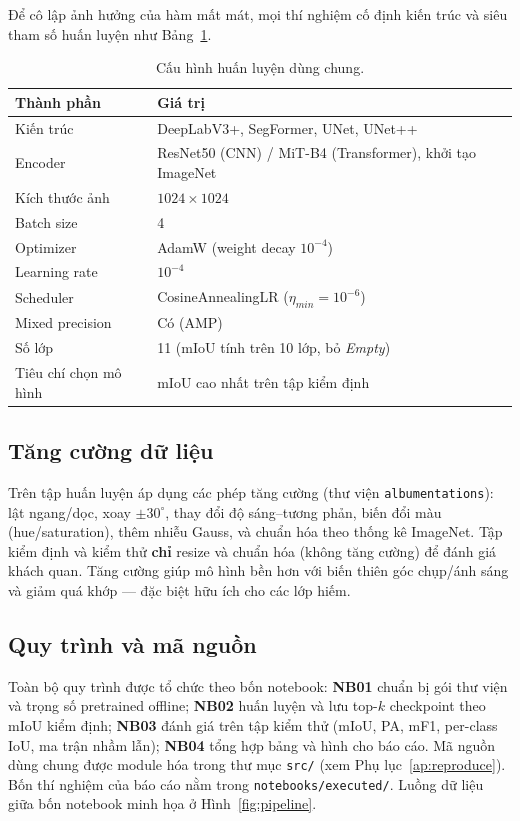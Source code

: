 Để cô lập ảnh hưởng của hàm mất mát, mọi thí nghiệm cố định kiến trúc và siêu tham
số huấn luyện như Bảng~\ref{tab:config}.

\begin{table}[H]
\centering
\caption{Cấu hình huấn luyện dùng chung.}
\label{tab:config}
\begin{tabular}{l l}
\toprule
\textbf{Thành phần} & \textbf{Giá trị} \\
\midrule
Kiến trúc            & DeepLabV3+, SegFormer, UNet, UNet++ \\
Encoder              & ResNet50 (CNN) / MiT-B4 (Transformer), khởi tạo ImageNet \\
Kích thước ảnh       & $1024 \times 1024$ \\
Batch size           & 4 \\
Optimizer            & AdamW (weight decay $10^{-4}$) \\
Learning rate        & $10^{-4}$ \\
Scheduler            & CosineAnnealingLR ($\eta_{min}=10^{-6}$) \\
Mixed precision      & Có (AMP) \\
Số lớp               & 11 (mIoU tính trên 10 lớp, bỏ \textit{Empty}) \\
Tiêu chí chọn mô hình& mIoU cao nhất trên tập kiểm định \\
\bottomrule
\end{tabular}
\end{table}

\subsection{Tăng cường dữ liệu}
Trên tập huấn luyện áp dụng các phép tăng cường (thư viện \texttt{albumentations}):
lật ngang/dọc, xoay $\pm30^\circ$, thay đổi độ sáng--tương phản, biến đổi màu
(hue/saturation), thêm nhiễu Gauss, và chuẩn hóa theo thống kê ImageNet. Tập kiểm
định và kiểm thử \textbf{chỉ} resize và chuẩn hóa (không tăng cường) để đánh giá khách
quan. Tăng cường giúp mô hình bền hơn với biến thiên góc chụp/ánh sáng và giảm
quá khớp --- đặc biệt hữu ích cho các lớp hiếm.

\subsection{Quy trình và mã nguồn}
Toàn bộ quy trình được tổ chức theo bốn notebook: \textbf{NB01} chuẩn bị gói thư viện
và trọng số pretrained offline; \textbf{NB02} huấn luyện và lưu top-$k$ checkpoint
theo mIoU kiểm định; \textbf{NB03} đánh giá trên tập kiểm thử (mIoU, PA, mF1,
per-class IoU, ma trận nhầm lẫn); \textbf{NB04} tổng hợp bảng và hình cho báo cáo. Mã
nguồn dùng chung được module hóa trong thư mục \texttt{src/} (xem
Phụ lục~\ref{ap:reproduce}). Bốn thí nghiệm của báo cáo nằm trong
\texttt{notebooks/executed/}. Luồng dữ liệu giữa bốn notebook minh họa ở
Hình~\ref{fig:pipeline}.

